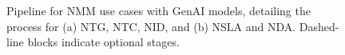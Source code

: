 \begin{figure}[t]
    \centering
    
    


    \caption{
    Pipeline for NMM use cases with GenAI models, detailing the process for (a) NTG, NTC, NID, and (b) NSLA and NDA.
    Dashed-line blocks
    indicate optional stages.
    }
    \label{fig: usecase_detail}
\end{figure}